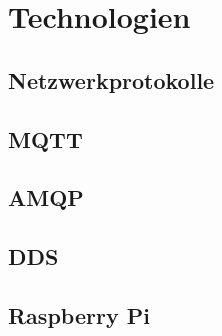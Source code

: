 \section{Technologien}
\label{sec:technologien}
\subsection{Netzwerkprotokolle}
\subsection{MQTT}
\subsection{AMQP}
\subsection{DDS}
\subsection{Raspberry Pi}